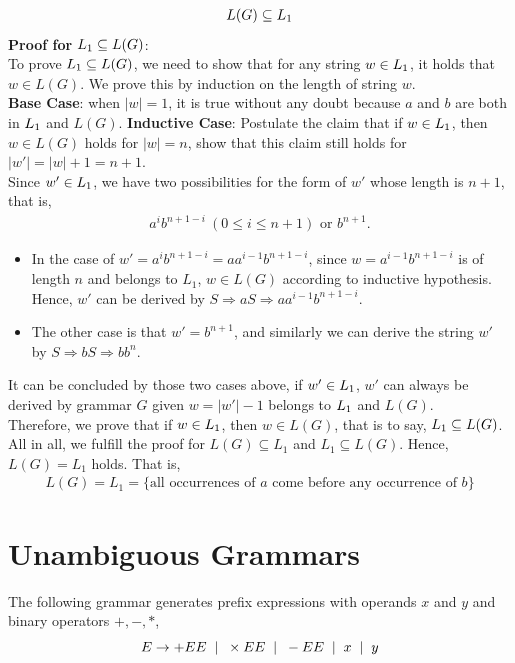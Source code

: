 \documentclass[11pt,a4paper]{article}
\newcommand{\htab}{\hspace*{0.63cm}}
\newcommand{\ba}{\hspace*{0.2cm} | \hspace*{0.2cm}}
\newcommand{\pg}{\\[0.3cm]}
\begin{document}
\begin{align}
    L(G) \subseteq L_{1}
    \end{align}
\htab \textbf{Proof for $L_{1} \subseteq L(G)$}: \\
\htab To prove $L_{1} \subseteq L(G)$, we need to show that for any string $w \in L_{1}$,
it holds that $ w \in L(G)$. We prove this by induction on the length of string $w$. \\
\htab \textbf{Base Case}: when $|w| = 1$, it is true without any doubt because $a$ and $b$ are
both in $L_{1}$ and $L(G)$.
\htab \textbf{Inductive Case}: Postulate the claim that if $w \in L_{1}$, then $w \in L(G)$ 
holds for $|w| = n$, show that this claim still holds for $|w'| = |w| + 1 = n+1$. \\
\htab Since $w' \in L_{1}$, we have two possibilities for the form of $w'$ whose length is $n+1$, that is,
    \begin{align}
        \text{$a^{i}b^{n+1-i}\ (0 \leq i \leq n+1)$ or $b^{n+1}$}. 
    \end{align}
\begin{itemize}
\item{In the case of $w' = a^{i}b^{n+1-i} = a a^{i-1}b^{n+1-i}$, since $w = a^{i-1}b^{n+1-i}$ is 
        of length $n$ and belongs to $L_{1}$, $w \in L(G)$ according to inductive hypothesis.
        Hence, $w'$ can be derived by $S \Rightarrow aS \Rightarrow  a a^{i-1}b^{n+1-i} $.}
\item{The other case is that $w' = b^{n+1}$, and similarly we can derive the string $w'$ by
    $S \Rightarrow bS \Rightarrow b b^{n}$.}
\end{itemize}
\htab It can be concluded by those two cases above, if $w' \in L_{1}$, $w'$ can always
be derived by grammar $G$ given $w = |w'| - 1$ belongs to $L_{1}$ and $L(G)$. \\
\htab Therefore, we prove that if $w \in L_{1}$, then $w \in L(G)$, that is to say, $L_{1} \subseteq L(G)$. \pg
\htab All in all, we fulfill the proof for $L(G) \subseteq L_{1}$ and $L_{1} \subseteq L(G)$. Hence,
$L(G) = L_{1}$ holds. That is, 
\begin{align}
    L(G) = L_{1} = \{ \text{all occurrences of $a$ come before any occurrence of $b$} \}
    \end{align}
 \newpage
 \section{Unambiguous Grammars}
\htab The following grammar generates prefix expressions with operands $x$ and $y$ and binary operators $+,-,*$,
    $$ E \rightarrow +EE \ba \times EE \ba - EE \ba x \ba y $$
\end{document}
